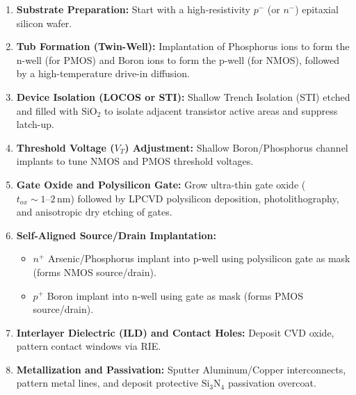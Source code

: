 \documentclass[12pt,a4paper]{article}
\begin{document}
\begin{enumerate}[label=\arabic*., leftmargin=*]
  \item \textbf{Substrate Preparation:} Start with a high-resistivity $p^-$ (or $n^-$) epitaxial silicon wafer.
  \item \textbf{Tub Formation (Twin-Well):} Implantation of Phosphorus ions to form the n-well (for PMOS) and Boron ions to form the p-well (for NMOS), followed by a high-temperature drive-in diffusion.
  \item \textbf{Device Isolation (LOCOS or STI):} Shallow Trench Isolation (STI) etched and filled with $\text{SiO}_2$ to isolate adjacent transistor active areas and suppress latch-up.
  \item \textbf{Threshold Voltage ($V_T$) Adjustment:} Shallow Boron/Phosphorus channel implants to tune NMOS and PMOS threshold voltages.
  \item \textbf{Gate Oxide and Polysilicon Gate:} Grow ultra-thin gate oxide ($t_{ox} \sim 1\text{--}2\,\text{nm}$) followed by LPCVD polysilicon deposition, photolithography, and anisotropic dry etching of gates.
  \item \textbf{Self-Aligned Source/Drain Implantation:}
    \begin{itemize}
      \item $n^+$ Arsenic/Phosphorus implant into p-well using polysilicon gate as mask (forms NMOS source/drain).
      \item $p^+$ Boron implant into n-well using gate as mask (forms PMOS source/drain).
    \end{itemize}
  \item \textbf{Interlayer Dielectric (ILD) and Contact Holes:} Deposit CVD oxide, pattern contact windows via RIE.
  \item \textbf{Metallization and Passivation:} Sputter Aluminum/Copper interconnects, pattern metal lines, and deposit protective $\text{Si}_3\text{N}_4$ passivation overcoat.
\end{enumerate}
\end{document}
